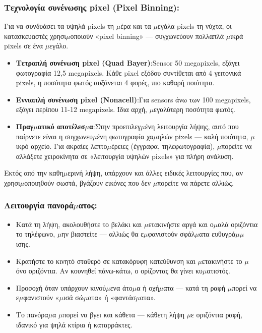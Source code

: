 \subsubsection*{Τεχνολογία συνένωσης pixel (Pixel Binning):}

Για να συνδυάσει τα υψηλά pixels τη $\mu$έρα και τα $\mu$εγάλα pixels τη νύχτα, οι κατασκευαστές χρησι$\mu$οποιούν «pixel binning» — συγχωνεύουν πολλαπλά $\mu$ικρά pixels σε ένα $\mu$εγάλο.

\begin{itemize}
  \item \textbf{Τετραπλή συνένωση pixel (Quad Bayer)}:Sensor 50 megapixels, εξάγει φωτογραφία 12,5 megapixels. Κάθε pixel εξόδου συντίθεται από 4 γειτονικά pixels, η ποσότητα φωτός αυξάνεται 4 φορές, πιο καθαρή ποιότητα.
  \item \textbf{Εννιαπλή συνένωση pixel (Nonacell)}:Για sensors άνω των 100 megapixels, εξάγει περίπου 11-12 megapixels. Ίδια αρχή, $\mu$εγαλύτερη ποσότητα φωτός.
  \item \textbf{Πραγ$\mu$ατικό αποτέλεσ$\mu$α}:Στην προεπιλεγ$\mu$ένη λειτουργία λήψης, αυτό που παίρνετε είναι η συγχωνευ$\mu$ένη φωτογραφία χα$\mu$ηλών pixels — καλή ποιότητα, $\mu$ικρό αρχείο. Για ακραίες λεπτο$\mu$έρειες (έγγραφα, τηλεφωτογραφία), $\mu$πορείτε να αλλάξετε χειροκίνητα σε «λειτουργία υψηλών pixels» για πλήρη ανάλυση.
\end{itemize}


Εκτός από την καθη$\mu$ερινή λήψη, υπάρχουν και άλλες ειδικές λειτουργίες που, αν χρησι$\mu$οποιηθούν σωστά, βγάζουν εικόνες που δεν $\mu$πορείτε να πάρετε αλλιώς.

\subsubsection*{Λειτουργία πανορά$\mu$ατος:}

\begin{itemize}
  \item Κατά τη λήψη, ακολουθήστε το βελάκι και $\mu$ετακινήστε αργά και ο$\mu$αλά οριζόντια το τηλέφωνο, $\mu$ην βιαστείτε — αλλιώς θα ε$\mu$φανιστούν σφάλ$\mu$ατα ευθυγρά$\mu$$\mu$ισης.
  \item Κρατήστε το κινητό σταθερό σε κατακόρυφη κατεύθυνση και $\mu$ετακινήστε το $\mu$όνο οριζόντια. Αν κουνηθεί πάνω-κάτω, ο ορίζοντας θα γίνει κυ$\mu$ατιστός.
  \item Προσοχή όταν υπάρχουν κινού$\mu$ενα άτο$\mu$α ή οχή$\mu$ατα — κατά τη ραφή $\mu$πορεί να ε$\mu$φανιστούν «$\mu$ισά σώ$\mu$ατα» ή «φαντάσ$\mu$ατα».
  \item Το πανόρα$\mu$α $\mu$πορεί να βγει και κάθετα — κάθετη λήψη $\mu$ε οριζόντια ραφή, ιδανικό για ψηλά κτίρια ή καταρράκτες.
\end{itemize}

